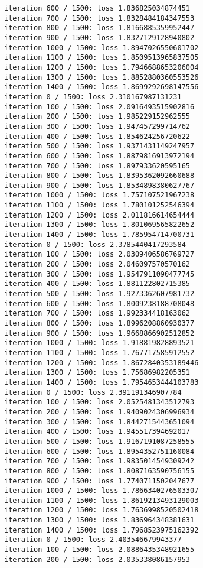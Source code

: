 \documentclass[11pt]{article}
\begin{document}
\begin{Verbatim}[commandchars=\\\{\}]
iteration 600 / 1500: loss 1.836825034874451
iteration 700 / 1500: loss 1.8328484184347553
iteration 800 / 1500: loss 1.8166885359952447
iteration 900 / 1500: loss 1.8327129128940802
iteration 1000 / 1500: loss 1.8947026550601702
iteration 1100 / 1500: loss 1.8509513965837505
iteration 1200 / 1500: loss 1.7946688653206004
iteration 1300 / 1500: loss 1.8852880360553526
iteration 1400 / 1500: loss 1.8699292698147556
iteration 0 / 1500: loss 2.310167987131231
iteration 100 / 1500: loss 2.0916493515902816
iteration 200 / 1500: loss 1.985229152962555
iteration 300 / 1500: loss 1.947457299714762
iteration 400 / 1500: loss 1.854624256720622
iteration 500 / 1500: loss 1.9371431149247957
iteration 600 / 1500: loss 1.8879816913972194
iteration 700 / 1500: loss 1.897933620595165
iteration 800 / 1500: loss 1.8395362092660688
iteration 900 / 1500: loss 1.8534898380627767
iteration 1000 / 1500: loss 1.757107521967238
iteration 1100 / 1500: loss 1.780101252546394
iteration 1200 / 1500: loss 2.011816614654444
iteration 1300 / 1500: loss 1.801069565822652
iteration 1400 / 1500: loss 1.785954714700731
iteration 0 / 1500: loss 2.3785440417293584
iteration 100 / 1500: loss 2.0309406586769727
iteration 200 / 1500: loss 2.046097570570162
iteration 300 / 1500: loss 1.9547911090477745
iteration 400 / 1500: loss 1.881122802715385
iteration 500 / 1500: loss 1.9273362607981732
iteration 600 / 1500: loss 1.8009238188708048
iteration 700 / 1500: loss 1.992334418163062
iteration 800 / 1500: loss 1.8996208860930377
iteration 900 / 1500: loss 1.9668866902512852
iteration 1000 / 1500: loss 1.918819828893521
iteration 1100 / 1500: loss 1.767717585912552
iteration 1200 / 1500: loss 1.8672840353189446
iteration 1300 / 1500: loss 1.75686982205351
iteration 1400 / 1500: loss 1.7954653444103783
iteration 0 / 1500: loss 2.391191346907784
iteration 100 / 1500: loss 2.0525481343512793
iteration 200 / 1500: loss 1.9409024306996934
iteration 300 / 1500: loss 1.8442715443651094
iteration 400 / 1500: loss 1.945517394692017
iteration 500 / 1500: loss 1.9167191087258555
iteration 600 / 1500: loss 1.8954352751160084
iteration 700 / 1500: loss 1.9835014549309242
iteration 800 / 1500: loss 1.8087163590756155
iteration 900 / 1500: loss 1.7740711502047677
iteration 1000 / 1500: loss 1.7866340276503307
iteration 1100 / 1500: loss 1.8619213493129003
iteration 1200 / 1500: loss 1.7636998520502418
iteration 1300 / 1500: loss 1.836964348381631
iteration 1400 / 1500: loss 1.7968523975162392
iteration 0 / 1500: loss 2.403546679943377
iteration 100 / 1500: loss 2.0886435348921655
iteration 200 / 1500: loss 2.035338086157953

\end{Verbatim}
\end{document}
